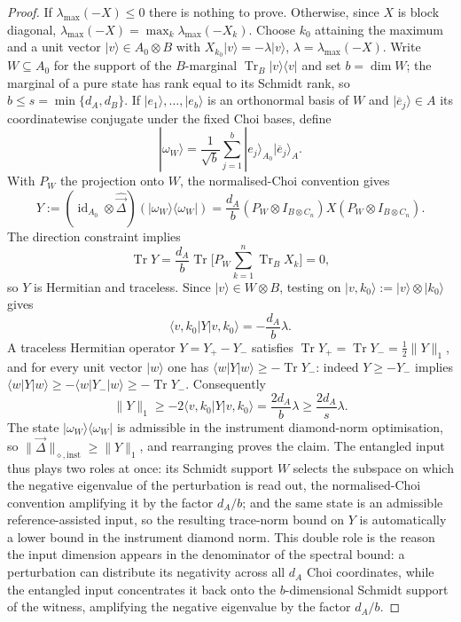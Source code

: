 \documentclass[11pt,a4paper]{article}
\newcommand{\Tr}{\operatorname{Tr}}
\newcommand{\id}{\operatorname{id}}
\newcommand{\vD}{\vec{\Delta}}
\begin{document}
\begin{proof}
If $\lambda_{\max}(-X)\le0$ there is nothing to prove. Otherwise, since $X$ is block diagonal, $\lambda_{\max}(-X)=\max_k\lambda_{\max}(-X_k)$. Choose $k_0$ attaining the maximum and a unit vector $|v\rangle\in A_0\otimes B$ with $X_{k_0}|v\rangle=-\lambda|v\rangle$, $\lambda=\lambda_{\max}(-X)$. Write $W\subseteq A_0$ for the support of the $B$-marginal $\Tr_B|v\rangle\langle v|$ and set $b=\dim W$; the marginal of a pure state has rank equal to its Schmidt rank, so $b\le s=\min\{d_A,d_B\}$. If $|e_1\rangle,\dots,|e_b\rangle$ is an orthonormal basis of $W$ and $|\overline e_j\rangle\in A$ its coordinatewise conjugate under the fixed Choi bases, define
\[
|\omega_W\rangle=\frac1{\sqrt b}\sum_{j=1}^b|e_j\rangle_{A_0}|\overline e_j\rangle_A.
\]
With $P_W$ the projection onto $W$, the normalised-Choi convention gives
\[
Y:=(\id_{A_0}\otimes\widehat{\vD})(|\omega_W\rangle\langle\omega_W|)
=\frac{d_A}{b}(P_W\otimes I_{B\otimes C_n})X(P_W\otimes I_{B\otimes C_n}).
\]
The direction constraint implies
\[
\Tr Y=\frac{d_A}{b}\Tr\Big[P_W\sum_{k=1}^n\Tr_BX_k\Big]=0,
\]
so $Y$ is Hermitian and traceless. Since $|v\rangle\in W\otimes B$, testing on $|v,k_0\rangle:=|v\rangle\otimes|k_0\rangle$ gives
\[
\langle v,k_0|Y|v,k_0\rangle=-\frac{d_A}{b}\lambda.
\]
A traceless Hermitian operator $Y=Y_+-Y_-$ satisfies $\Tr Y_+=\Tr Y_-=\tfrac12\|Y\|_1$, and for every unit vector $|w\rangle$ one has $\langle w|Y|w\rangle\ge-\Tr Y_-$: indeed $Y\ge-Y_-$ implies $\langle w|Y|w\rangle\ge-\langle w|Y_-|w\rangle\ge-\Tr Y_-$. Consequently
\[
\|Y\|_1\ge-2\langle v,k_0|Y|v,k_0\rangle
=\frac{2d_A}{b}\lambda\ge\frac{2d_A}{s}\lambda.
\]
The state $|\omega_W\rangle\langle\omega_W|$ is admissible in the instrument diamond-norm optimisation, so $\|\vD\|_{\diamond,\mathrm{inst}}\ge\|Y\|_1$, and rearranging proves the claim. The entangled input thus plays two roles at once: its Schmidt support $W$ selects the subspace on which the negative eigenvalue of the perturbation is read out, the normalised-Choi convention amplifying it by the factor $d_A/b$; and the same state is an admissible reference-assisted input, so the resulting trace-norm bound on $Y$ is automatically a lower bound in the instrument diamond norm. This double role is the reason the input dimension appears in the denominator of the spectral bound: a perturbation can distribute its negativity across all $d_A$ Choi coordinates, while the entangled input concentrates it back onto the $b$-dimensional Schmidt support of the witness, amplifying the negative eigenvalue by the factor $d_A/b$.
\end{proof}
\end{document}
